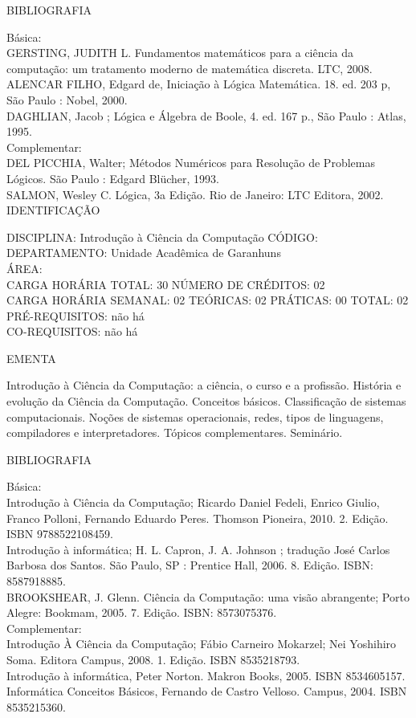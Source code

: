\documentclass[
	12pt,				%
	openright,			%
  oneside,     %
	a4paper,			%
	english,			%
	french,				%
	spanish,			%
	brazil				%
	]{abntex2}
\begin{document}
\begin{apendicesenv}
BIBLIOGRAFIA

Básica: \\
GERSTING, JUDITH L. Fundamentos matemáticos para a ciência da
computação: um tratamento moderno de matemática discreta. LTC, 2008.\\
ALENCAR FILHO, Edgard de, Iniciação à Lógica Matemática. 18. ed. 203 p,
São Paulo : Nobel, 2000.\\
DAGHLIAN, Jacob ; Lógica e Álgebra de Boole, 4. ed. 167 p., São Paulo :
Atlas, 1995.\\
Complementar: \\
DEL PICCHIA, Walter; Métodos Numéricos para Resolução de Problemas
Lógicos. São Paulo : Edgard Blücher, 1993.\\
SALMON, Wesley C. Lógica, 3a Edição. Rio de Janeiro: LTC Editora, 2002.\\


\newpage IDENTIFICAÇÃO

DISCIPLINA: Introdução à Ciência da Computação CÓDIGO:\\
DEPARTAMENTO: Unidade Acadêmica de Garanhuns\\
ÁREA: \\
CARGA HORÁRIA TOTAL: 30 NÚMERO DE CRÉDITOS: 02\\
CARGA HORÁRIA SEMANAL: 02 TEÓRICAS: 02 PRÁTICAS: 00 TOTAL: 02\\
PRÉ-REQUISITOS: não há\\
CO-REQUISITOS: não há
 
EMENTA 
 
Introdução à Ciência da Computação: a ciência, o curso e a profissão.
História e evolução da Ciência da Computação. Conceitos básicos.
Classificação de sistemas computacionais. Noções de sistemas
operacionais, redes, tipos de linguagens, compiladores e
interpretadores. Tópicos complementares. Seminário.

BIBLIOGRAFIA 

Básica:\\
Introdução à Ciência da Computação; Ricardo Daniel Fedeli, Enrico
Giulio, Franco Polloni, Fernando Eduardo Peres. Thomson Pioneira, 2010.
2. Edição. ISBN 9788522108459.\\
Introdução à informática; H. L. Capron, J. A. Johnson ; tradução José
Carlos\\
Barbosa dos Santos. São Paulo, SP : Prentice Hall, 2006. 8. Edição. ISBN: 8587918885.\\
BROOKSHEAR, J. Glenn. Ciência da Computação: uma visão abrangente; Porto
Alegre: Bookmam, 2005. 7. Edição. ISBN: 8573075376.\\
Complementar:\\
Introdução À Ciência da Computação; Fábio Carneiro Mokarzel; Nei
Yoshihiro Soma. Editora Campus, 2008. 1. Edição. ISBN 8535218793.\\
Introdução à informática, Peter Norton. Makron Books, 2005. ISBN
8534605157.\\
Informática Conceitos Básicos, Fernando de Castro Velloso. Campus, 2004.
ISBN 8535215360.\\



\end{apendicesenv}
\end{document}
